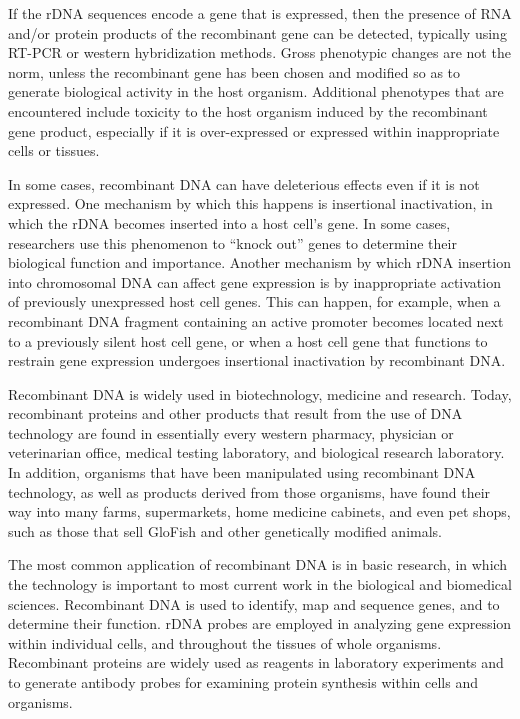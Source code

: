If the rDNA sequences encode a gene that is expressed, then the presence of RNA and/or protein products of the recombinant gene can be detected, typically using RT-PCR or western hybridization methods. Gross phenotypic changes are not the norm, unless the recombinant gene has been chosen and modified so as to generate biological activity in the host organism. Additional phenotypes that are encountered include toxicity to the host organism induced by the recombinant gene product, especially if it is over-expressed or expressed within inappropriate cells or tissues.

In some cases, recombinant DNA can have deleterious effects even if it is not expressed. One mechanism by which this happens is insertional inactivation, in which the rDNA becomes inserted into a host cell's gene. In some cases, researchers use this phenomenon to ``knock out'' genes to determine their biological function and importance. Another mechanism by which rDNA insertion into chromosomal DNA can affect gene expression is by inappropriate activation of previously unexpressed host cell genes. This can happen, for example, when a recombinant DNA fragment containing an active promoter becomes located next to a previously silent host cell gene, or when a host cell gene that functions to restrain gene expression undergoes insertional inactivation by recombinant DNA.

Recombinant DNA is widely used in biotechnology, medicine and research. Today, recombinant proteins and other products that result from the use of DNA technology are found in essentially every western pharmacy, physician or veterinarian office, medical testing laboratory, and biological research laboratory. In addition, organisms that have been manipulated using recombinant DNA technology, as well as products derived from those organisms, have found their way into many farms, supermarkets, home medicine cabinets, and even pet shops, such as those that sell GloFish and other genetically modified animals.

The most common application of recombinant DNA is in basic research, in which the technology is important to most current work in the biological and biomedical sciences. Recombinant DNA is used to identify, map and sequence genes, and to determine their function. rDNA probes are employed in analyzing gene expression within individual cells, and throughout the tissues of whole organisms. Recombinant proteins are widely used as reagents in laboratory experiments and to generate antibody probes for examining protein synthesis within cells and organisms.

